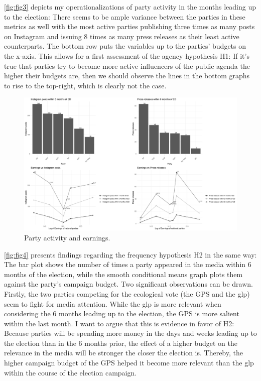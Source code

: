 \documentclass[11pt,a4paper]{article}
\begin{document}
\autoref{fig:fig3} depicts my operationalizations of party activity in the months leading up to the election: There seems to be ample variance between the parties in these metrics as well with the most active parties publishing three times as many posts on Instagram and issuing 8 times as many press releases as their least active counterparts. The bottom row puts the variables up to the parties’ budgets on the x-axis. This allows for a first assessment of the agency hypothesis H1: If it’s true that parties try to become more active influencers of the public agenda the higher their budgets are, then we should observe the lines in the bottom graphs to rise to the top-right, which is clearly not the case.
\begin{figure}
    \centering
    \includegraphics[width=1\linewidth]{output/plots/plot_figure_3.png}
    \caption{Party activity and earnings.}
    \label{fig:fig3}
\end{figure}
\autoref{fig:fig4} presents findings regarding the frequency hypothesis H2 in the same way: The bar plot shows the number of times a party appeared in the media within 6 months of the election, while the smooth conditional means graph plots them against the party’s campaign budget. Two significant observations can be drawn. Firstly, the two parties competing for the ecological vote (the GPS and the glp) seem to fight for media attention. While the glp is more relevant when considering the 6 months leading up to the election, the GPS is more salient within the last month. I want to argue that this is evidence in favor of H2: Because parties will be spending more money in the days and weeks leading up to the election than in the 6 months prior, the effect of a higher budget on the relevance in the media will be stronger the closer the election is. Thereby, the higher campaign budget of the GPS helped it become more relevant than the glp within the course of the election campaign. 
\end{document}
